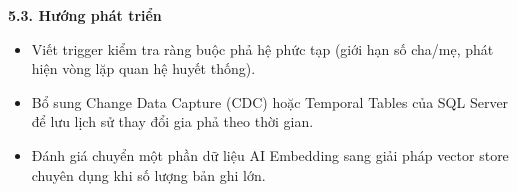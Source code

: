 {}
{\Large\bfseries 5.3. Hướng phát triển}\par\vspace{0.7em}

\begin{itemize}
\item Viết trigger kiểm tra ràng buộc phả hệ phức tạp (giới hạn số cha/mẹ, phát hiện vòng lặp quan hệ huyết thống).
\item Bổ sung Change Data Capture (CDC) hoặc Temporal Tables của SQL Server để lưu lịch sử thay đổi gia phả theo thời gian.
\item Đánh giá chuyển một phần dữ liệu AI Embedding sang giải pháp vector store chuyên dụng khi số lượng bản ghi lớn.
\end{itemize}